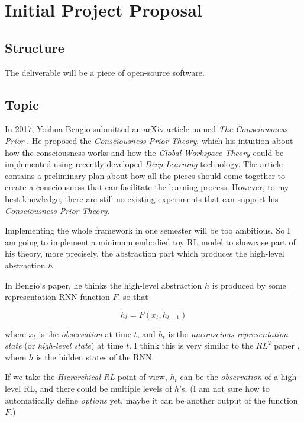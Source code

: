 



\section*{Initial Project Proposal}

\subsection*{Structure}
The deliverable will be a piece of open-source software.

\subsection*{Topic}
In 2017, Yoshua Bengio submitted an arXiv article named \emph{The Consciousness Prior} \cite{bengio_consciousness_2019}. He proposed the \emph{Consciousness Prior Theory}, which his intuition about how the consciousness works and how the \emph{Global Workspace Theory} could be implemented using recently developed \emph{Deep Learning} technology. The article contains a preliminary plan about how all the pieces should come together to create a consciousness that can facilitate the learning process. However, to my best knowledge, there are still no existing experiments that can support his \emph{Consciousness Prior Theory}.

Implementing the whole framework in one semester will be too ambitious. So I am going to implement a minimum embodied toy RL model to showcase part of his theory, more precisely, the abstraction part which produces the high-level abstraction $h$.

In Bengio's paper, he thinks the high-level abstraction $h$ is produced by some representation RNN function $F$, so that

\begin{equation*}
    h_t = F(x_t, h_{t-1})
\end{equation*}

where $x_t$ is the \emph{observation} at time $t$, and $h_{t}$ is the \emph{unconscious representation state} (or \emph{high-level state}) at time $t$.
I think this is very similar to the $RL^2$ paper \cite{duan_rl2_2016}, where $h$ is the hidden states of the RNN. 

If we take the \emph{Hierarchical RL} point of view, $h_t$ can be the \emph{observation} of a high-level RL, and there could be multiple levels of $h$'s. (I am not sure how to automatically define \emph{options} yet, maybe it can be another output of the function $F$.)

